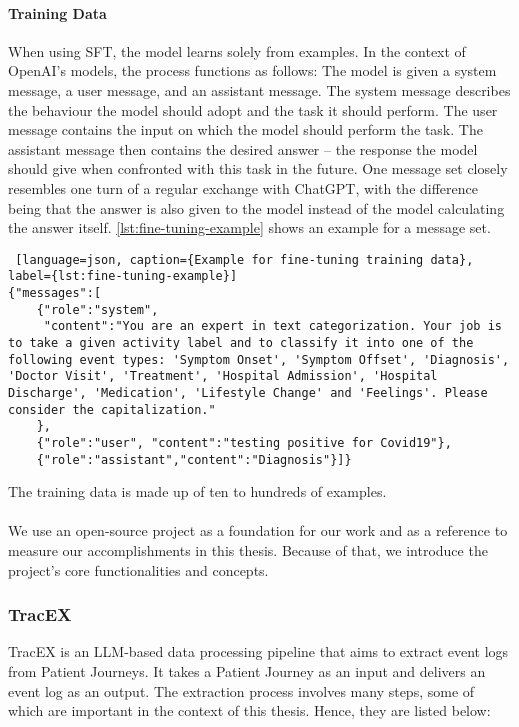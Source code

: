 \paragraph{Training Data}
When using SFT, the model learns solely from examples. In the context of OpenAI's models, the process functions as follows: The model is given a system message, a user message, and an assistant message. The system message describes the behaviour the model should adopt and the task it should perform. The user message contains the input on which the model should perform the task. The assistant message then contains the desired answer – the response the model should give when confronted with this task in the future.
One message set closely resembles one turn of a regular exchange with ChatGPT, with the difference being that the answer is also given to the model instead of the model calculating the answer itself. \autoref{lst:fine-tuning-example} shows an example for a message set.
\begin{lstlisting} [language=json, caption={Example for fine-tuning training data}, label={lst:fine-tuning-example}]   
{"messages":[
    {"role":"system",
     "content":"You are an expert in text categorization. Your job is to take a given activity label and to classify it into one of the following event types: 'Symptom Onset', 'Symptom Offset', 'Diagnosis', 'Doctor Visit', 'Treatment', 'Hospital Admission', 'Hospital Discharge', 'Medication', 'Lifestyle Change' and 'Feelings'. Please consider the capitalization."
    },
    {"role":"user", "content":"testing positive for Covid19"},
    {"role":"assistant","content":"Diagnosis"}]}
\end{lstlisting}
The training data is made up of ten to hundreds of examples.\\\\
We use an open-source project as a foundation for our work and as a reference to measure our accomplishments in this thesis. Because of that, we introduce the project's core functionalities and concepts.

\subsubsection*{TracEX}\label{sec:tracex}
TracEX is an LLM-based data processing pipeline that aims to extract event logs from Patient Journeys. It takes a Patient Journey as an input and delivers an event log as an output. The extraction process involves many steps, some of which are important in the context of this thesis. Hence, they are listed below:
